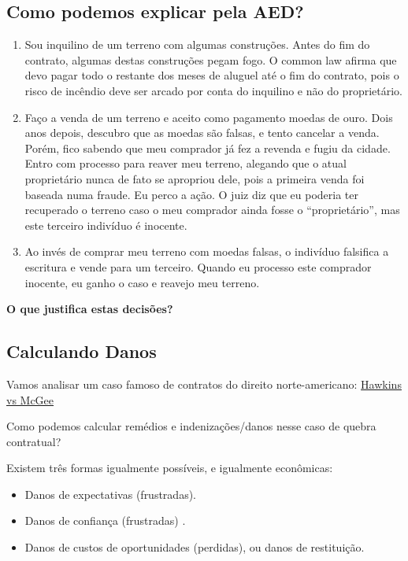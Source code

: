 \documentclass[a4paper,12pt]{article}[abntex2]
\begin{document}
\subsection{\textbf{Como podemos explicar pela AED?}}
\begin{enumerate}
    \item Sou inquilino de um terreno com algumas construções. Antes do fim do contrato, algumas destas construções pegam fogo. O common law afirma que devo pagar todo o restante dos meses de aluguel até o fim do contrato, pois o risco de incêndio deve ser arcado por conta do inquilino e não do proprietário.
    \item Faço a venda de um terreno e aceito como pagamento moedas de ouro. Dois anos depois, descubro que as moedas são falsas, e tento cancelar a venda. Porém, fico sabendo que meu comprador já fez a revenda e fugiu da cidade. Entro com processo para reaver meu terreno, alegando que o atual proprietário nunca de fato se apropriou dele, pois a primeira venda foi baseada numa fraude. Eu perco a ação. O juiz diz que eu poderia ter recuperado o terreno caso o meu comprador ainda fosse o “proprietário”, mas este terceiro indivíduo é inocente. 
    \item Ao invés de comprar meu terreno com moedas falsas, o indivíduo falsifica a escritura e vende para um terceiro. Quando eu processo este comprador inocente, eu ganho o caso e reavejo meu terreno. 
\end{enumerate}

\textbf{O que justifica estas decisões?}

\subsection{\textbf{Calculando Danos}}
Vamos analisar um caso famoso de contratos do direito norte-americano: \href{https://www.youtube.com/watch?v=_983pIQ_0sw}{Hawkins vs McGee}

Como podemos calcular remédios e indenizações/danos nesse caso de quebra contratual?

Existem três formas igualmente possíveis, e igualmente econômicas:\begin{itemize}
    \item Danos de expectativas (frustradas).
    \item Danos de confiança (frustradas) .
    \item Danos de custos de oportunidades (perdidas), ou danos de restituição.
\end{itemize}
\end{document}
